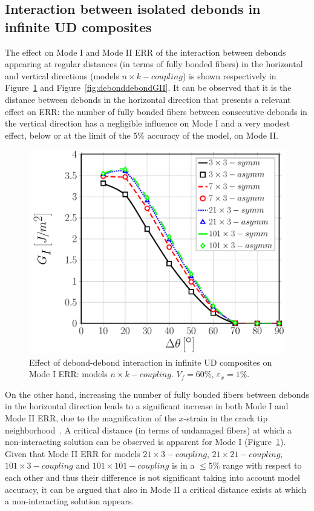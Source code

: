 \documentclass[smallextended]{svjour3}       %
\begin{document}
\subsection{Interaction between isolated debonds in infinite UD composites}\label{subsec:chesstable}

The effect on Mode I and Mode II ERR of the interaction between debonds appearing at regular distances (in terms of fully bonded fibers) in the horizontal and vertical directions (models $n\times k-coupling$) is shown respectively in Figure~\ref{fig:debonddebondGI} and Figure~\ref{fig:debonddebondGII}. It can be observed that it is the distance between debonds in the horizontal direction that presents a relevant effect on ERR: the number of fully bonded fibers between consecutive debonds in the vertical direction has a negligible influence on Mode I and a very modest effect, below or at the limit of the $5\%$ accuracy of the model, on Mode II.

\begin{figure}[!h]
\centering
\includegraphics[width=\textwidth]{nxk-coupling-vf60-GI.pdf}
\caption{Effect of debond-debond interaction in infinite UD composites on Mode I ERR: models $n\times k-coupling$. $V_{f}=60\%$, $\varepsilon_{x}=1\%$.}\label{fig:debonddebondGI}
\end{figure}

On the other hand, increasing the number of fully bonded fibers between debonds in the horizontal direction leads to a significant increase in both Mode I and Mode II ERR, due to the magnification of the $x$-strain in the crack tip neighborhood~\cite{DiStasio2019}. A critical distance (in terms of undamaged fibers) at which a non-interacting solution can be observed is apparent for Mode I (Figure~\ref{fig:debonddebondGI}). Given that Mode II ERR for models $21\times 3-coupling$, $21\times 21-coupling$, $101\times 3-coupling$ and $101\times 101-coupling$ is in a $\leq5\%$ range with respect to each other and thus their difference is not significant taking into account model accuracy, it can be argued that also in Mode II a critical distance exists at which a non-interacting solution appears.
\end{document}
